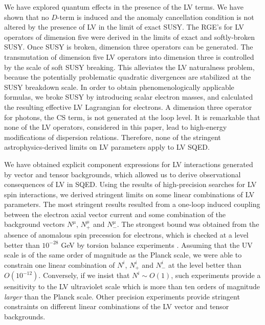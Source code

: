 \documentclass[12pt]{revtex4}
\begin{document}
We have explored quantum effects in the presence of the 
LV terms. We have shown that no $D$-term is induced and 
the anomaly cancellation condition is not altered by the presence of
LV in the limit of exact SUSY. The RGE's for LV operators of dimension
five were derived in the limits of exact and softly-broken SUSY. Once
SUSY is broken, dimension three operators can be generated.  
The transmutation of dimension five LV operators into dimension three
is controlled by the scale of soft SUSY breaking. This alleviates the 
LV naturalness problem, because the potentially problematic quadratic
divergences are stabilized at the SUSY breakdown scale.
In order to obtain phenomenologically applicable formulas, we broke
SUSY by introducing scalar electron masses, and calculated the resulting effective
LV Lagrangian for electrons. A dimension three
operator for photons, the CS term, is not generated at the
loop level. It is remarkable that none of the LV operators, considered
in this paper, lead to high-energy modifications of dispersion relations.  
Therefore, none of the stringent astrophysics-derived limits on LV
parameters  \cite{Ted1,GK} apply to LV SQED. 


We have obtained explicit component expressions for LV
interactions generated by vector and tensor backgrounds, which allowed
us to derive observational consequences of LV in SQED. Using the results
of high-precision searches for LV spin interactions, we derived  
stringent limits on some linear combinations of LV parameters. The most
stringent results resulted from a one-loop induced coupling between the
electron axial vector current and some combination of the background
vectors $N^\mu$, $N^\mu_+$ and $N^{\mu}_-$. The strongest bound was
obtained from the absence of anomalous spin precession for electrons,
which is checked at a level better than $10^{-28}$ GeV by
torsion balance experiments \cite{Heckel:1999sy}. Assuming that the UV
scale is of the same order of magnitude as the Planck scale, 
we were able to constrain one linear combination of $N^i$, $N^i_+$ and
$N^i_-$ at the level better than $O(10^{-12})$. Conversely, if we
insist that $N^i \sim O(1)$,  such experiments provide a sensitivity to
the LV ultraviolet scale which is more than ten orders of magnitude
{\em larger} than the Planck scale. Other precision experiments
\cite{clock1,clock2} provide stringent constraints on different
linear combinations of the LV vector and tensor backgrounds.
\end{document}
